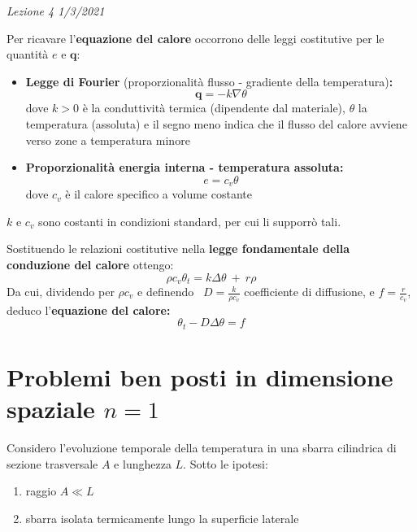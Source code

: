 \documentclass[10pt,a4paper,twoside,openright]{book}
\begin{document}
\textit{Lezione 4 1/3/2021}

Per ricavare l'\textbf{equazione del calore} occorrono delle leggi costitutive per le quantità $\displaystyle e$ e $\displaystyle \mathbf{q}$:
\begin{itemize}
\item \textbf{Legge di Fourier }(proporzionalità flusso - gradiente della temperatura)\textbf{:}\begin{equation*}
\mathbf{q} =-k\nabla \theta 
\end{equation*}dove $\displaystyle k >0$ è la conduttività termica (dipendente dal materiale), $\displaystyle \theta $ la temperatura (assoluta) e il segno meno indica che il flusso del calore avviene verso zone a temperatura minore
\item \textbf{Proporzionalità energia interna - temperatura assoluta:}\begin{equation*}
e=c_{v} \theta 
\end{equation*}dove $\displaystyle c_{v}$ è il calore specifico a volume costante
\end{itemize}



$\displaystyle k$ e $\displaystyle c_{v}$ sono costanti in condizioni standard, per cui li supporrò tali.

Sostituendo le relazioni costitutive nella \textbf{legge fondamentale della conduzione del calore} ottengo:
\begin{equation*}
\rho c_{v} \theta _{t} =k\Delta \theta \ +\ r\rho 
\end{equation*}
Da cui, dividendo per $\displaystyle \rho c_{v}$ e definendo \ $\displaystyle D=\frac{k}{\rho c_{v}}$ coefficiente di diffusione, e $\displaystyle {\textstyle f=\frac{r}{c_{v}}}$, deduco l'\textbf{equazione del calore:}
\begin{equation*}
\boxed{\theta _{t} -D\Delta \theta =f}
\end{equation*}

\section{Problemi ben posti in dimensione spaziale \texorpdfstring{$n=1$}{n = 1}}

Considero l'evoluzione temporale della temperatura in una sbarra cilindrica di sezione trasversale $\displaystyle A$ e lunghezza $\displaystyle L$. Sotto le ipotesi:
\begin{enumerate}
\item  raggio $\displaystyle A\ll L$
\item  sbarra isolata termicamente lungo la superficie laterale
\end{enumerate}
\end{document}
